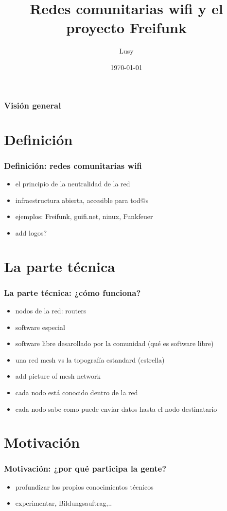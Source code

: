 \documentclass[12pt, xcolor=table]{beamer}
\begin{document}
\title{Redes comunitarias wifi y el proyecto Freifunk}
\author{Lusy}
\date{\today}

\begin{frame}
    \titlepage
\end{frame}

\begin{frame}
    \frametitle{Visión general}
    \tableofcontents
\end{frame}

\section{Definición}
\begin{frame}
  \frametitle{Definición: redes comunitarias wifi}
    \begin{itemize}
      \item el principio de la neutralidad de la red
      \item infraestructura abierta, accesible para tod@s
      \item ejemplos: Freifunk, guifi.net, ninux, Funkfeuer
      \item add logos?
    \end{itemize}
\end{frame}

\section{La parte técnica}
\begin{frame}
  \frametitle{La parte técnica: ¿cómo funciona?}
    \begin{itemize}
      \item nodos de la red: routers
      \item software especial
      \item software libre desarollado por la comunidad (qué es software libre)
      \item una red mesh vs la topografía estandard (estrella)
      \item add picture of mesh network
      \item cada nodo está conocido dentro de la red
      \item cada nodo sabe como puede enviar datos hasta el nodo destinatario
    \end{itemize}
\end{frame}

\section{Motivación}
\begin{frame}
  \frametitle{Motivación: ¿por qué participa la gente?}
  \begin{itemize}
    \item profundizar los propios conocimientos técnicos
    \item experimentar, Bildungsauftrag,..
  \end{itemize}
\end{frame}
\end{document}
